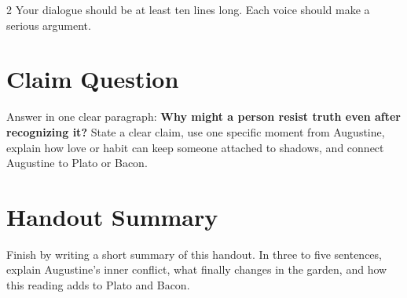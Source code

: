 \documentclass[12pt]{article}
\begin{document}
\begin{multicols}{2}
Your dialogue should be at least ten lines long. Each voice should make a serious argument.

\section*{Claim Question}
Answer in one clear paragraph: \textbf{Why might a person resist truth even after recognizing it?} State a clear claim, use one specific moment from Augustine, explain how love or habit can keep someone attached to shadows, and connect Augustine to Plato or Bacon.

\section*{Handout Summary}
Finish by writing a short summary of this handout. In three to five sentences, explain Augustine's inner conflict, what finally changes in the garden, and how this reading adds to Plato and Bacon.

\end{multicols}
\end{document}
